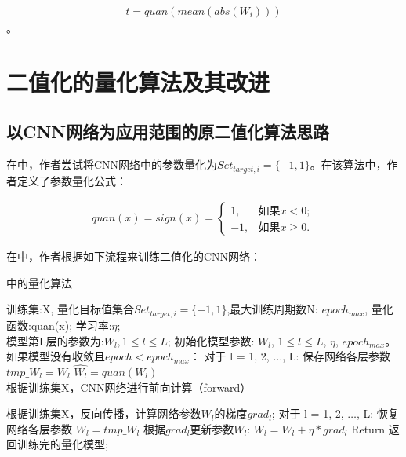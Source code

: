 \documentclass[ pdftex, oneside, master]{NJUthesis}
\begin{document}
\begin{eqnarray}
t = quan(mean(abs(W_i)))
\label{new.quan}
\end{eqnarray}。



\section{二值化的量化算法及其改进}

\subsection{以CNN网络为应用范围的原二值化算法思路}

在\cite{binary}中，作者尝试将CNN网络中的参数量化为$Set_ {target,i} = \{-1,1\}$。在该算法中，作者定义了参数量化公式：

\begin{eqnarray}
quan(x) = sign(x) = \begin{cases}
		1,& \text{如果} x < 0; \\
		-1,& \text{如果} x \geq 0.
		\end{cases}
\end{eqnarray}

在\cite{binary}中，作者根据如下流程来训练二值化的CNN网络：

\begin{algorithm}[htb]
  \caption{\cite{binary}中的量化算法}
  \label{41training}
  \begin{algorithmic}[1]
    \REQUIRE
      训练集:X, 量化目标值集合$Set_ {target,i} = \{-1,1\}$,最大训练周期数N: $epoch_{max}$,
      量化函数:quan(x); 学习率:$\eta$;
      \\
    \ENSURE 模型第L层的参数为:${W_l, 1\leq l\leq L}$;
    \STATE 初始化模型参数: ${W_l}$, ${1\leq l\leq L}$, $\eta$, $epoch_{max}$。
    \STATE 如果模型没有收敛且$epoch<epoch_{max}$：
    \STATE \qquad 对于 l = 1, 2, $\ldots$, L:
    \STATE \qquad \qquad 保存网络各层参数 $tmp\_W_l=W_l$
    \STATE \qquad \qquad $\hat{W_l}=quan(W_l)$
    \STATE \qquad 根据训练集X，CNN网络进行前向计算（forward）

    \STATE \qquad 根据训练集X，反向传播，计算网络参数$W_l$的梯度$grad_l$;
    \STATE \qquad 对于 l = 1, 2, $\ldots$, L:
    \STATE \qquad \qquad 恢复网络各层参数 $W_l = tmp\_W_l$
    \STATE \qquad \qquad 根据$grad_l$更新参数$W_l$: $W_l = W_l+ \eta*grad_l$
    \STATE Return 返回训练完的量化模型;
  \end{algorithmic}
\end{algorithm}
\end{document}
